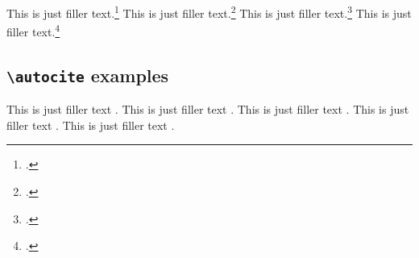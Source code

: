 \documentclass[a4paper]{article}
\newcommand{\cmd}[1]{\texttt{\textbackslash #1}}
\begin{document}
\clearpage

This is just filler text.\footcite{kant:kpv}
This is just filler text.\footcite{kant:ku}
This is just filler text.\footcite[24]{kant:kpv}
This is just filler text.\footcite[59--63]{kant:ku}

\clearpage

\subsection*{\cmd{autocite} examples}


This is just filler text \autocite{aristotle:rhetoric}.
This is just filler text \autocite{averroes/bland}.
This is just filler text \autocite{aristotle:anima}.
This is just filler text \autocite[55]{aristotle:anima}.
This is just filler text \autocite[55]{aristotle:anima}.

\clearpage


\printshorthands
\printbibliography
\end{document}
